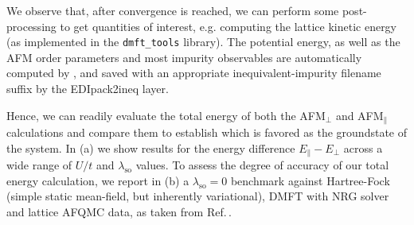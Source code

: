 \documentclass[edipack_sp.tex]{subfiles}
\begin{document}
We observe that, after convergence is reached, we can perform some 
post-processing to get quantities of interest, e.g. computing the 
lattice kinetic energy (as implemented in the \texttt{dmft\_tools} 
library). The potential energy, as well as the AFM order parameters
and most impurity observables are automatically computed by \NAME, 
and saved with an appropriate inequivalent-impurity filename suffix 
by the EDIpack2ineq layer.

Hence, we can readily evaluate the total energy of both the AFM$_\perp$
and AFM$_\parallel$ calculations and compare them to establish which 
is favored as the groundstate of the system. In (a)
we show results for the energy difference $E_\parallel-E_\perp$ across
a wide range of $U/t$ and $\lambda_\mathrm{so}$ values. To assess the
degree of accuracy of our total energy calculation, we report in
(b) a $\lambda_\mathrm{so}=0$ benchmark against
Hartree-Fock (simple static mean-field, but inherently variational), 
DMFT with NRG solver and lattice AFQMC data, as taken from 
Ref.\,\cite{Racz2020}. 
\end{document}
